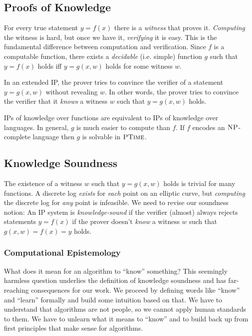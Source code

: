 \subsection{Proofs of Knowledge}

For every true statement $y = f(x)$ there is a \emph{witness} that proves it.
\emph{Computing} the witness is hard,
but once we have it,
\emph{verifying} it is easy.
This is the fundamental difference between computation and verification.
%
Since $f$ is a computable function,
there exists a \emph{decidable} (i.e. simple) function $g$
such that $y = f(x)$ holds iff $y = g(x, w)$ holds for some witness $w$.

In an extended IP,
the prover tries to convince the verifier of a statement $y = g(x, w)$ without revealing $w$.
In other words,
the prover tries to convince the verifier that it \emph{knows} a witness $w$ such that $y = g(x, w)$ holds.

IPs of knowledge over functions are equivalent to IPs of knowledge over languages.
%
In general,
$g$ is much easier to compute than $f$.
If $f$ encodes an $\operatorname{\textsc{NP}}$-complete language then $g$ is solvable in $\operatorname{\textsc{PTime}}$.

\subsection{Knowledge Soundness}

The existence of a witness $w$ such that $y = g(x, w)$ holds is trivial for many functions.
A discrete log \emph{exists} for \emph{each} point on an elliptic curve,
but \emph{computing} the discrete log for \emph{any} point is infeasible.
We need to revise our soundness notion:
%
An IP system is \emph{knowledge-sound} if the verifier (almost) always rejects statements $y = f(x)$
if the prover doesn't \emph{know} a witness $w$ such that $g(x, w) = f(x) = y$ holds.

\subsubsection{Computational Epistemology}

What does it mean for an algorithm to \enquote{know} something?
This seemingly harmless question underlies the definition of knowledge soundness and has far-reaching consequences for our work.
%
We proceed by defining words like \enquote{know} and \enquote{learn} formally
and build some intuition based on that.
We have to understand that algorithms are not people,
so we cannot apply human standards to them.
We have to unlearn what it means to \enquote{know} and to build back up from first principles that make sense for algorithms.

